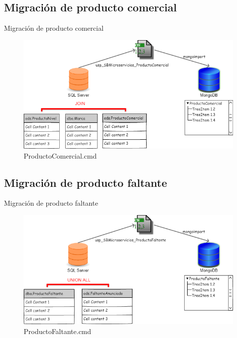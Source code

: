 \documentclass{bredelebeamer}
\begin{document}
\subsection{Migración de producto comercial}
\begin{frame}{Migración de producto comercial}
\begin{figure}
\centering
\includegraphics[scale=0.35]{imgs/ProductoComercial.png}
\caption{ProductoComercial.cmd}
\end{figure}
\end{frame}

\subsection{Migración de producto faltante}
\begin{frame}{Migración de producto faltante}
\begin{figure}
\centering
\includegraphics[scale=0.35]{imgs/ProductoFaltante.png}
\caption{ProductoFaltante.cmd}
\end{figure}
\end{frame}
\end{document}
